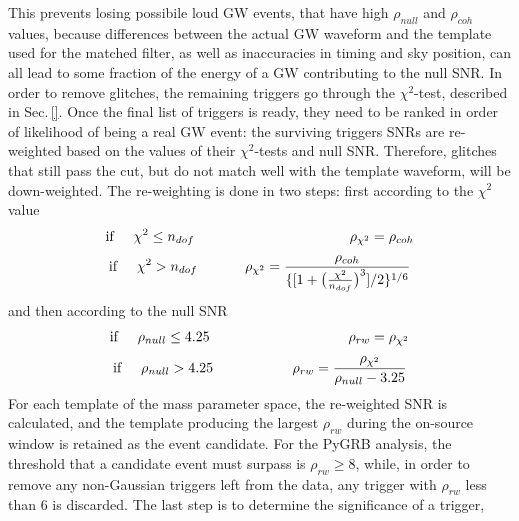 \documentclass[binding=0.6cm, LaM]{sapthesis}
\begin{document}
	This prevents losing possibile loud GW events, that have high $\rho_{null}$ and $\rho_{coh}$ values,
	because differences between the actual GW waveform and the template used for the matched filter, 
	as well as inaccuracies in timing and sky position, can all lead to some fraction of the energy of a GW contributing to the null SNR. 	
	In order to remove glitches, the remaining triggers go through the $\chi^2$-test, described in Sec.\,\ref{}.
	Once the final list of triggers is ready, they need to be ranked in order of likelihood of being a real GW event:
	the surviving triggers SNRs are re-weighted based on the values of their $\chi^2$-tests and null SNR.
	Therefore, glitches that still pass the cut, but do not match well with the template waveform, will be down-weighted.
	The re-weighting is done in two steps: first according  to  the  $\chi^2$ value
		\begin{equation}
		\text{if} \hspace*{0.5cm} \chi^2 \leq n_{dof} \hspace*{3.9cm} \rho_{\chi^2} =  \rho_{coh} 
		\end{equation}
		\begin{equation}
		\text{if} \hspace*{0.5cm} \chi^2 > n_{dof} \hspace*{1.2cm} \rho_{\chi^2} =  {{\rho_{coh}}  \over {\{[1+ \big( {{\chi^2} \over {n_{dof}}} \big)^3 ]/2\}^{1/6}}}
		\end{equation}	
	and then according to the null SNR
		\begin{equation}
			\text{if} \hspace*{0.5cm} \rho_{null} \leq 4.25 \hspace*{3.5cm} \rho_{rw} = \rho_{\chi^2}
		\end{equation}
		\begin{equation}
			\text{if} \hspace*{0.5cm} \rho_{null} > 4.25 \hspace*{2cm} \rho_{rw} = {{ \rho_{\chi^2}}  \over {\rho_{null} - 3.25}}
		\end{equation}
	For each template of the mass parameter space, 
	the re-weighted SNR is calculated, and the template producing the largest $\rho_{rw}$ 
	during the on-source window is retained as the event candidate. 
	For the {\ttfamily PyGRB} analysis, the threshold that a candidate event must surpass is $\rho_{rw} \geq 8$,
	while, in order to remove any non-Gaussian triggers left from the data, 
	any trigger with $\rho_{rw}$ less than 6 is discarded.
	The last step is to determine the significance of a trigger,
\end{document}
